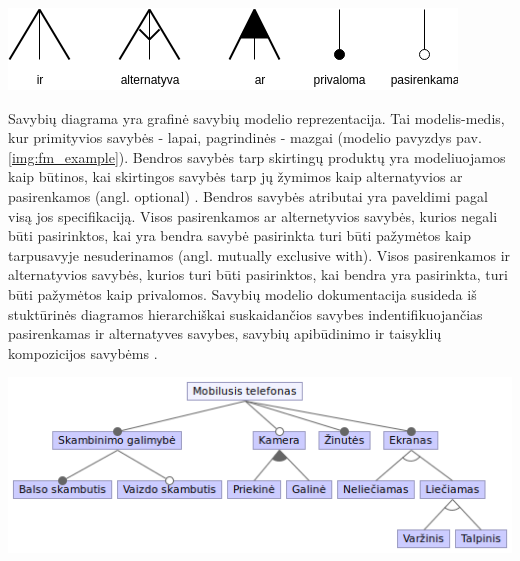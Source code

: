 \documentclass{VUMIFPSkursinis}
\begin{document}
\begin{center}
    \includegraphics[scale=0.75]{img/feature_model_rules}
    \label{img:fm_rules}

\end{center}

Savybių diagrama yra grafinė savybių modelio reprezentacija. Tai modelis-medis, kur primityvios savybės - lapai, pagrindinės - mazgai (modelio pavyzdys pav. \ref{img:fm_example}). Bendros savybės tarp skirtingų produktų yra modeliuojamos kaip būtinos, kai skirtingos savybės tarp jų žymimos kaip alternatyvios ar pasirenkamos (angl. optional) \cite{Batory2005}. Bendros savybės atributai yra paveldimi pagal visą jos specifikaciją. Visos pasirenkamos ar alternetyvios savybės, kurios negali būti pasirinktos, kai yra bendra savybė pasirinkta turi būti pažymėtos kaip tarpusavyje nesuderinamos (angl. mutually exclusive with). Visos pasirenkamos ir alternatyvios savybės, kurios turi būti pasirinktos, kai bendra yra pasirinkta, turi būti pažymėtos kaip privalomos. Savybių modelio dokumentacija susideda iš stuktūrinės diagramos hierarchiškai suskaidančios savybes indentifikuojančias pasirenkamas ir alternatyves savybes, savybių apibūdinimo ir taisyklių kompozicijos savybėms \cite{Kang1990}. 

\begin{center}
    \includegraphics[scale=0.6]{img/mobile}
    \label{img:fm_example}
\end{center}
\end{document}
